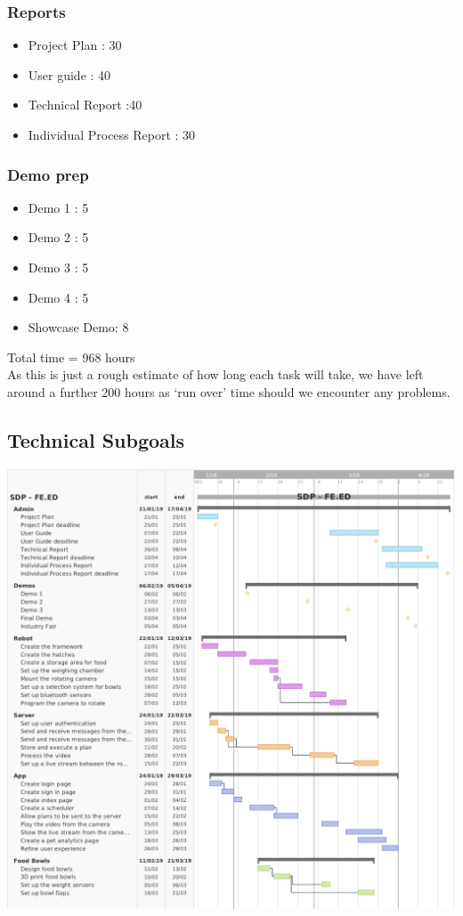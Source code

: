      \subsubsection{Reports}
    \begin{itemize}
        \setlength{\itemindent}{.2in}
        \item Project Plan : 30
        \item User guide : 40
        \item Technical Report :40
        \item Individual Process Report : 30
    \end{itemize}



     \subsubsection{Demo prep}
    
    \begin{itemize}
        \setlength{\itemindent}{.2in}
        \item Demo 1 : 5
        \item Demo 2 : 5
        \item Demo 3 : 5
        \item Demo 4 : 5
        \item Showcase Demo: 8
    \end{itemize} 
    
    Total time = 968 hours \\
As this is just a rough estimate of how long each task will take, we have left around a further 200 hours as ‘run over’ time should we encounter any problems. 


    \subsection{Technical Subgoals}
    
    \includegraphics[width=\textwidth]{latex_gantt_chart.png}
    
